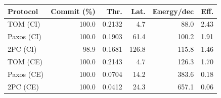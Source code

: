 \begin{tabular}{lrrrrr}
\hline
Protocol & Commit (\%) & Thr. & Lat. & Energy/dec & Eff. \\
\hline
TOM (CI) & 100.0 & 0.2132 & 4.7 & 88.0 & 2.43 \\
Paxos (CI) & 100.0 & 0.1903 & 61.4 & 100.2 & 1.91 \\
2PC (CI) & 98.9 & 0.1681 & 126.8 & 115.8 & 1.46 \\
TOM (CE) & 100.0 & 0.2143 & 4.7 & 126.3 & 1.70 \\
Paxos (CE) & 100.0 & 0.0704 & 14.2 & 383.6 & 0.18 \\
2PC (CE) & 100.0 & 0.0412 & 24.3 & 657.1 & 0.06 \\
\hline
\end{tabular}
